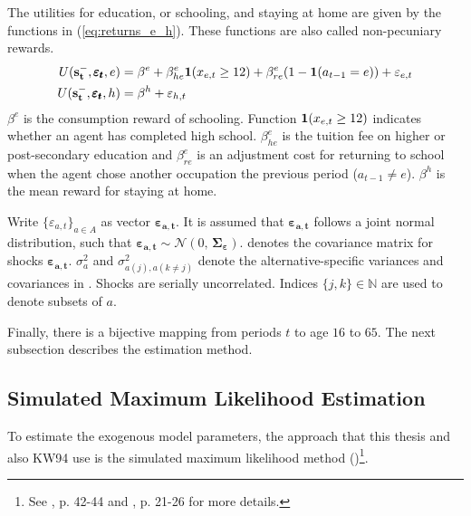 \documentclass[a4paper,12pt]{article}
\begin{document}
The utilities for education, or schooling, and staying at home are given by the functions in (\ref{eq:returns_e_h}). These functions are also called non-pecuniary rewards.
\begin{equation} \label{eq:returns_e_h}
\begin{aligned}
U(\bold{s_t^-}, \pmb{\varepsilon_t},e) &= \beta^e + \beta_{he}^e \bold 1(x_{e,t} \geq 12) + \beta_{re}^e(1-\bold1(a_{t-1}=e)) + \varepsilon_{e,t} \\
U(\bold{s_t^-},\pmb{\varepsilon_t},h) &= \beta^h + \varepsilon_{h,t} \\
\end{aligned}
\end{equation}
\noindent
$\beta^e$ is the consumption reward of schooling. Function $\bold 1(x_{e,t} \geq 12)$ indicates whether an agent has completed high school. $\beta_{he}^e$ is the tuition fee on higher or post-secondary education and $\beta_{re}^e$ is an adjustment cost for returning to school when the agent chose another occupation the previous period ($a_{t-1}\neq e$). $\beta^h$ is the mean reward for staying at home.

Write $\{\varepsilon_{a,t}\}_{a \in A}$ as vector $\pmb{\varepsilon_{a,t}}$. It is assumed that $\pmb{\varepsilon_{a,t}}$ follows a joint normal distribution, such that $\pmb{\varepsilon_{a,t}} \sim \mathcal{N}(0,\,\pmb{\Sigma_\varepsilon})$. \pmb{$\Sigma_\varepsilon$} denotes the covariance matrix for shocks $\pmb{\varepsilon_{a,t}}$. $\sigma_a^{2}$ and $\sigma^{2}_{a(j),a(k\neq j)}$ denote the alternative-specific variances and covariances in \pmb{$\Sigma_\varepsilon$}. Shocks are serially uncorrelated. Indices $\{j,k\} \in \mathbb{N}$ are used to denote subsets of $a$.

Finally, there is a bijective mapping from periods $t$ to age $16$ to $65$. The next subsection describes the estimation method.

\subsection{Simulated Maximum Likelihood Estimation}

To estimate the exogenous model parameters, the approach that this thesis and also KW94 use is the simulated maximum likelihood method (\cite{Albright.1977})\footnote{See \cite{Aguirregabiria.2010}, p. 42-44 and \cite{Raabe.2019}, p. 21-26 for more details.}.
\end{document}
